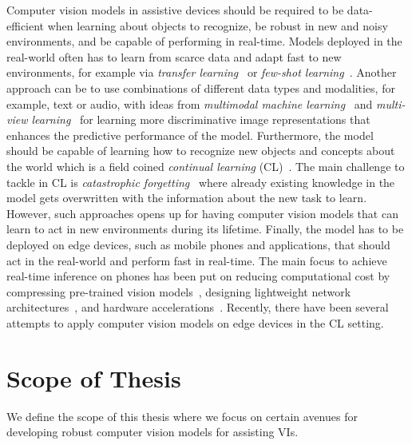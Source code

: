 Computer vision models in assistive devices should be required to be data-efficient when learning about objects to recognize, be robust in new and noisy environments, and be capable of performing in real-time. Models deployed in the real-world often has to learn from scarce data and adapt fast to new environments, for example via \textit{transfer learning}~\cite{sharif2014cnn, zhuang2020comprehensive} or \textit{few-shot learning}~\cite{wang2020generalizing}. Another approach can be to use combinations of different data types and modalities, for example, text or audio, with ideas from \textit{multimodal machine learning}~\cite{baltruvsaitis2018multimodal} and \textit{multi-view learning}~\cite{xu2013survey} for learning more discriminative image representations that enhances the predictive performance of the model. Furthermore, the model should be capable of learning how to recognize new objects and concepts about the world which is a field coined \textit{continual learning} (CL)~\cite{delange2021continual, parisi2019continual}. The main challenge to tackle in CL is \textit{catastrophic forgetting}~\cite{mccloskey1989catastrophic} where already existing knowledge in the model gets overwritten with the information about the new task to learn. However, such approaches opens up for having computer vision models that can learn to act in new environments during its lifetime. Finally, the model has to be deployed on edge devices, such as mobile phones and applications, that should act in the real-world and perform fast in real-time. The main focus to achieve real-time inference on phones has been put on reducing computational cost by compressing pre-trained vision models~\cite{han2015deep}, designing lightweight network architectures~\cite{howard2017mobilenets, zhang2018shufflenet}, and hardware accelerations~\cite{huynh2017deepmon}. Recently, there have been several attempts to apply computer vision models on edge devices in the CL setting\cite{ li2019rilod, pellegrini2019latent}.



\section{Scope of Thesis}\label{sec:scope_of_thesis}

We define the scope of this thesis where we focus on certain avenues for developing robust computer vision models for assisting VIs. 


